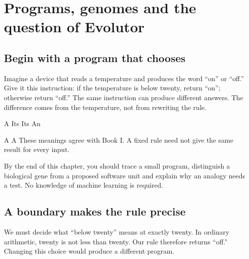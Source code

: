 \chapter{Programs, genomes and the question of Evolutor}\label{ch:one}
\section{Begin with a program that chooses}\label{sec:program}
Imagine a device that reads a temperature and produces the word “on” or “off.” Give it this instruction: if the temperature is below twenty, return “on”; otherwise return “off.” The same instruction can produce different answers. The difference comes from the temperature, not from rewriting the rule.

A  Its  Its  An 

A  A  These meanings agree with Book I. A fixed rule need not give the same result for every input.

By the end of this chapter, you should trace a small program, distinguish a biological gene from a proposed software unit and explain why an analogy needs a test. No knowledge of machine learning is required.

\clearpage
\section{A boundary makes the rule precise}\label{sec:boundary}
We must decide what “below twenty” means at exactly twenty. In ordinary arithmetic, twenty is not less than twenty. Our rule therefore returns “off.” Changing this choice would produce a different program.

